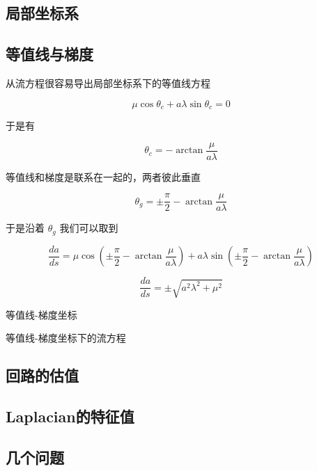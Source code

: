\documentclass[a4paper,12pt]{article}
\numberwithin{definition}{section}
\numberwithin{lemma}{section}
\numberwithin{proposition}{section}
\numberwithin{theorem}{section}
\numberwithin{grammar}{section}
\numberwithin{program}{section}
\numberwithin{convention}{section}
\numberwithin{corollary}{section}
\begin{document}
\subsection{局部坐标系}

\subsection{等值线与梯度}

从流方程很容易导出局部坐标系下的等值线方程

\begin{equation}
    \mu \cos \theta_c + a \lambda \sin \theta_c = 0
\end{equation}

于是有

\begin{equation}
    \theta_c = - \arctan \frac{\mu}{a \lambda}
\end{equation}

等值线和梯度是联系在一起的，两者彼此垂直

\begin{equation}
    \theta_g = \pm \frac{\pi}{2} - \arctan \frac{\mu}{a \lambda}
\end{equation}

于是沿着 $\theta_g$ 我们可以取到

\begin{equation}
    \frac{da}{ds} = \mu \cos (\pm \frac{\pi}{2} - \arctan \frac{\mu}{a \lambda}) + a \lambda \sin (\pm \frac{\pi}{2} - \arctan \frac{\mu}{a \lambda})
\end{equation}

\begin{equation}
    \frac{da}{ds} = \pm \sqrt {a^2 \lambda^2 + \mu^2}
\end{equation}


等值线-梯度坐标

等值线-梯度坐标下的流方程



\subsection{回路的估值}

\subsection{Laplacian的特征值}

\subsection{几个问题}
\end{document}
